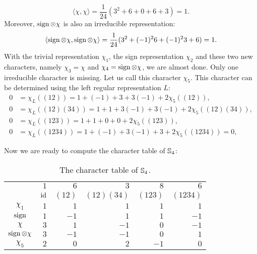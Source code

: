 \begin{example}
      \[
	 	\langle \chi,\chi\rangle=\frac{1}{24}(3^2+6+0+6+3)=1.
	 \]
     Moreover, $\operatorname{sign}\otimes\chi$ is also an irreducible representation:
     	\[
		\langle \operatorname{sign}\otimes\chi,\operatorname{sign}\otimes\chi\rangle=\frac{1}{24}(3^2+(-1)^26+(-1)^23+6)=1.
	\]
     With the trivial representation $\chi_1$, the sign representation $\chi_2$ and these two new characters, namely $\chi_3=\chi$ and $\chi_4=\operatorname{sign}\otimes\chi$, we are almost done. Only one irreducible character is missing. Let us call this
     character $\chi_5$. This character can be determined  
     using the left regular representation $L$: 
     \begin{align*}
		0 &= \chi_L\left( (12) \right)=1+(-1)+3+3(-1)+2\chi_5\left( (12) \right),\\
		0 &= \chi_L\left( (12)(34) \right)=1+1+3(-1)+3(-1)+2\chi_5\left( (12)(34) \right),\\
		0 &= \chi_L\left( (123) \right)=1+1+0+0+2\chi_5\left( (123) \right),\\
		0 &= \chi_L\left( (1234) \right)=1+(-1)+3(-1)+3+2\chi_5\left( (1234) \right)=0,
	\end{align*}
	
    Now we are ready to compute the character table of $\mathbb{S}_4$: 
    \begin{table}[h]
    \caption{The character table of $\mathbb{S}_4$.}      
		\begin{tabular}{|c|rrrrr|}
			\hline
            & $1$ & $6$ & $3$ & $8$ & $6$\tabularnewline
			& $\operatorname{id}$ & $(12)$ & $(12)(34)$ & $(123)$ & $(1234)$\tabularnewline
			\hline
			$\chi_1$ & $1$ & $1$ & $1$ & $1$ & $1$\tabularnewline
			$\operatorname{sign}$ & $1$ & $-1$ & $1$ & $1$ & $-1$\tabularnewline
			$\chi$ & $3$ & $1$ & $-1$ & $0$ & $-1$\tabularnewline
			$\operatorname{sign}\otimes\chi$ & $3$ & $-1$ & $-1$ & $0$ & $1$\tabularnewline
			$\chi_5$ & $2$ & $0$ & $2$ & $-1$ & $0$\tabularnewline
			\hline
		\end{tabular}
	\end{table}
\end{example}



